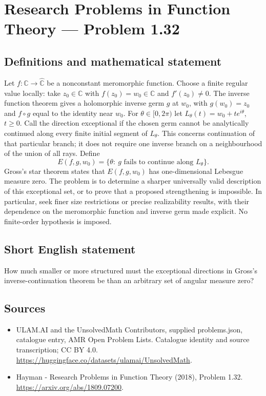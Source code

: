\documentclass[11pt,a4paper]{article}
\begin{document}
\section*{Research Problems in Function Theory — Problem 1.32}\label{statement}

\subsection{Definitions and mathematical statement}
Let $f:\mathbb C\to\widehat{\mathbb C}$ be a nonconstant meromorphic function. Choose a finite regular value locally: take $z_0\in\mathbb C$ with $f(z_0)=w_0\in\mathbb C$ and $f'(z_0)\ne0$. The inverse function theorem gives a holomorphic inverse germ $g$ at $w_0$, with $g(w_0)=z_0$ and $f\circ g$ equal to the identity near $w_0$.
For $\theta\in[0,2\pi)$ let $L_\theta(t)=w_0+te^{i\theta}$, $t\ge0$. Call the direction exceptional if the chosen germ cannot be analytically continued along every finite initial segment of $L_\theta$. This concerns continuation of that particular branch; it does not require one inverse branch on a neighbourhood of the union of all rays. Define
\[
E(f,g,w_0)=\{\theta:\ g\text{ fails to continue along }L_\theta\}.
\]
Gross's star theorem states that $E(f,g,w_0)$ has one-dimensional Lebesgue measure zero. The problem is to determine a sharper universally valid description of this exceptional set, or to prove that a proposed strengthening is impossible. In particular, seek finer size restrictions or precise realizability results, with their dependence on the meromorphic function and inverse germ made explicit. No finite-order hypothesis is imposed.
\subsection{Short English statement}
How much smaller or more structured must the exceptional directions in Gross's inverse-continuation theorem be than an arbitrary set of angular measure zero?
\subsection{Sources}
\begin{itemize}
\item[S1] ULAM.AI and the UnsolvedMath Contributors, supplied problems.json, catalogue entry, AMR Open Problem Lists. Catalogue identity and source transcription; CC BY 4.0.
\url{https://huggingface.co/datasets/ulamai/UnsolvedMath}.
\item[S2] Hayman - Research Problems in Function Theory (2018), Problem 1.32. 
\url{https://arxiv.org/abs/1809.07200}.
\end{itemize}
\end{document}

